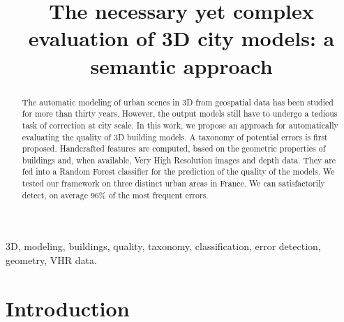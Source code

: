 \documentclass[conference]{IEEEtran}
\begin{document}
\title{The necessary yet complex evaluation of 3D city models: a semantic approach}

\author{
\and
{}
}

\maketitle


\begin{abstract}
	The automatic modeling of urban scenes in 3D from geospatial data has been studied for more than thirty years. However, the output models still have to undergo a tedious task of correction at city scale. In this work, we propose an approach for automatically evaluating the quality of 3D building models. A taxonomy of potential errors is first proposed. Handcrafted features are computed, based on the geometric properties of buildings and, when available, Very High Resolution images and depth data. They are fed into a Random Forest classifier for the prediction of the quality of the models. We tested our framework on three distinct urban areas in France. We can satisfactorily detect, on average 96\% of the most frequent errors.
\end{abstract}
\begin{IEEEkeywords}
  3D, modeling, buildings, quality, taxonomy, classification, error detection, geometry, VHR data.
\end{IEEEkeywords}

\section{Introduction}
\end{document}
